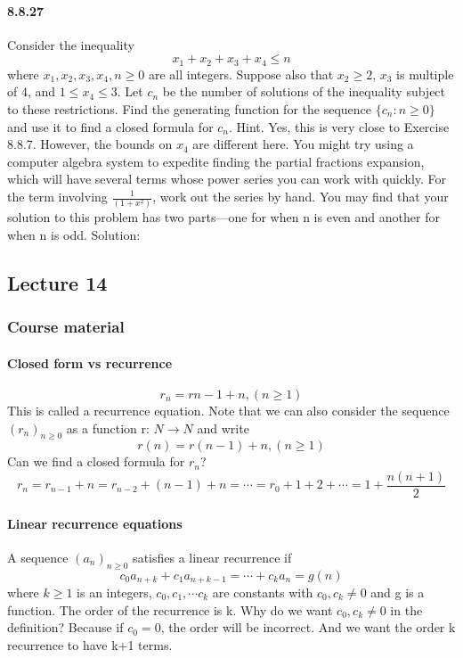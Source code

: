 \documentclass{article}
\begin{document}
\paragraph{8.8.27}
Consider the inequality $$x_1+x_2+x_3+x_4\leq n$$
where $x_1,x_2,x_3,x_4,n\ge 0$ are all integers. Suppose also that $x_2\ge 2$, $x_3$ is multiple of 4, and $1\leq x_4\leq 3$. Let $c_n$ be the number of solutions of the inequality subject to these restrictions. Find the generating function for the sequence $\{c_n: n\ge 0\}$ and use it to find a closed formula for $c_n$. \newline
Hint. Yes, this is very close to Exercise 8.8.7. However, the bounds on $x_4$ are different
here. You might try using a computer algebra system to expedite finding the partial fractions expansion, which will have several terms whose power series you can work with quickly. For the term involving $\frac{1}{(1+x^2)}$, work out the series by hand. You may find that your solution to this problem has two parts—one for when n is even and another for when n is odd.\newline
Solution:\newline

\subsection{Lecture 14}
\subsubsection{Course material}
\paragraph{Closed form vs recurrence}
$$r_n=r{n-1}+n, (n\ge 1)$$
This is called a recurrence equation.
Note that we can also consider the sequence $(r_n)_{n\ge 0}$ as a
function r: $N\longrightarrow N$ and write
$$r(n)=r(n-1)+n, (n\ge 1)$$
Can we find a closed formula for $r_n$?
$$r_n=r_{n-1}+n=r_{n-2}+(n-1)+n=\cdots =r_0+1+2+\cdots =1+\frac{n(n+1)}{2} $$
\paragraph{Linear recurrence equations}
A sequence $(a_n)_{n\ge 0}$ satisfies a linear recurrence if $$c_0a_{n+k}+c_1a_{n+k-1}=\cdots +c_ka_n=g(n)$$
where $k\ge 1$ is an integers, $c_0,c_1,\cdots c_k$ are constants with $c_0,c_k\neq 0$ and g is a function.\newline
The order of the recurrence is k.\newline
Why do we want $c_0,c_k\neq 0$ in the definition?\newline
Because if $c_0=0$, the order will be incorrect. And we want the order k recurrence to have k+1 terms.
\end{document}
